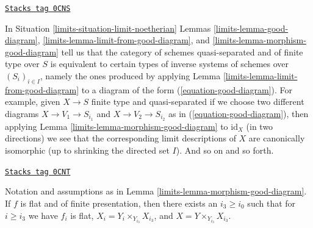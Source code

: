 \begin{remark}
\label{limits-remark-finite-type-gives-well-defined-system}
\href{https://stacks.math.columbia.edu/tag/0CNS}{\texttt{Stacks tag 0CNS}}

In Situation \ref{limits-situation-limit-noetherian}
Lemmas \ref{limits-lemma-good-diagram}, \ref{limits-lemma-limit-from-good-diagram}, and
\ref{limits-lemma-morphism-good-diagram}
tell us that the category of schemes quasi-separated and
of finite type over $S$ is equivalent to certain types of
inverse systems of schemes over $(S_i)_{i \in I}$, namely
the ones produced by applying Lemma \ref{limits-lemma-limit-from-good-diagram}
to a diagram of the form (\ref{equation-good-diagram}).
For example, given $X \to S$ finite type and quasi-separated
if we choose two different diagrams $X \to V_1 \to S_{i_1}$
and $X \to V_2 \to S_{i_2}$ as in (\ref{equation-good-diagram}), then
applying Lemma \ref{limits-lemma-morphism-good-diagram} to $\text{id}_X$
(in two directions)
we see that the corresponding limit descriptions of
$X$ are canonically isomorphic (up to shrinking the
directed set $I$). And so on and so forth.
\end{remark}

\begin{lemma}
\label{limits-lemma-morphism-good-diagram-flat}
\href{https://stacks.math.columbia.edu/tag/0CNT}{\texttt{Stacks tag 0CNT}}

Notation and assumptions as in Lemma \ref{limits-lemma-morphism-good-diagram}.
If $f$ is flat and of finite presentation, then
there exists an $i_3 \geq i_0$ such that for $i \geq i_3$ we have
$f_i$ is flat, $X_i = Y_i \times_{Y_{i_3}} X_{i_3}$, and
$X = Y \times_{Y_{i_3}} X_{i_3}$.
\end{lemma}

